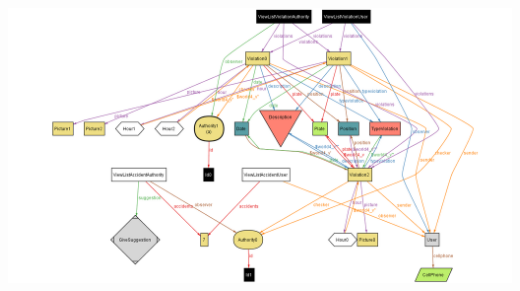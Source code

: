 \vspace{1cm}

\vspace{0.5cm}
\includegraphics[width=\textwidth]{Images/AlloyWorlds/World4.png}
\newpage
